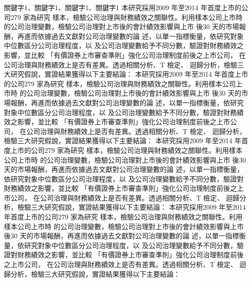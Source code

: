 \documentclass[
    添加扉頁=是,
    添加原創聲明頁=不,
    添加校徽水印=不,
    奇偶頁邊距對稱=不,
    參考文獻頂格=是,
]{.def/must}
\begin{document}
\begin{abstract@cn}{關鍵字1、關鍵字1、關鍵字1、關鍵字1}
本研究採用2009 年至2014 年首度上市的公司279 家為研究
樣本，檢驗公司治理與財務績效之關聯性。利用樣本公司上市時
的公司治理變數，檢驗公司治理對上市後的會計績效影響與上市
後30 天的市場報酬，再進而依據過去文獻對公司治理變數的論
述，以單一指標衡量，依研究對象中位數區分公司治理程度，以
及公司治理變數給予不同分數，驗證對財務績效之影響，並比較
「有價證券上市審查準則」強化公司治理制度前後之上市公司，
在公司治理與財務績效上是否有差異。透過相關分析、T 檢定、
迴歸分析，檢驗三大研究假說，實證結果獲得以下主要結論：
本研究採用2009 年至2014 年首度上市的公司279 家為研究
樣本，檢驗公司治理與財務績效之關聯性。利用樣本公司上市時
的公司治理變數，檢驗公司治理對上市後的會計績效影響與上市
後30 天的市場報酬，再進而依據過去文獻對公司治理變數的論
述，以單一指標衡量，依研究對象中位數區分公司治理程度，以
及公司治理變數給予不同分數，驗證對財務績效之影響，並比較
「有價證券上市審查準則」強化公司治理制度前後之上市公司，
在公司治理與財務績效上是否有差異。透過相關分析、T 檢定、
迴歸分析，檢驗三大研究假說，實證結果獲得以下主要結論：
本研究採用2009 年至2014 年首度上市的公司279 家為研究
樣本，檢驗公司治理與財務績效之關聯性。利用樣本公司上市時
的公司治理變數，檢驗公司治理對上市後的會計績效影響與上市
後30 天的市場報酬，再進而依據過去文獻對公司治理變數的論
述，以單一指標衡量，依研究對象中位數區分公司治理程度，以
及公司治理變數給予不同分數，驗證對財務績效之影響，並比較
「有價證券上市審查準則」強化公司治理制度前後之上市公司，
在公司治理與財務績效上是否有差異。透過相關分析、T 檢定、
迴歸分析，檢驗三大研究假說，實證結果獲得以下主要結論：
本研究採用2009 年至2014 年首度上市的公司279 家為研究
樣本，檢驗公司治理與財務績效之關聯性。利用樣本公司上市時
的公司治理變數，檢驗公司治理對上市後的會計績效影響與上市
後30 天的市場報酬，再進而依據過去文獻對公司治理變數的論
述，以單一指標衡量，依研究對象中位數區分公司治理程度，以
及公司治理變數給予不同分數，驗證對財務績效之影響，並比較
「有價證券上市審查準則」強化公司治理制度前後之上市公司，
在公司治理與財務績效上是否有差異。透過相關分析、T 檢定、
迴歸分析，檢驗三大研究假說，實證結果獲得以下主要結論：
\end{abstract@cn}
\end{document}

